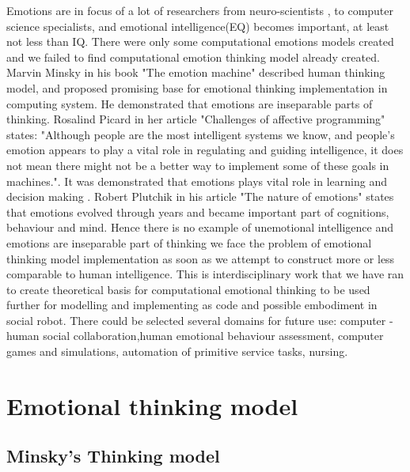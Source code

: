 Emotions are in focus of a lot of researchers from neuro-scientists \cite{emotionsbraintorobot, parsingreward, neuromodulatory, cubeofemotions}, to computer science specialists\cite{emotionandsociable, senticcomputing, hourglass, affectivemodelofinterplay, affectivecomputing}, and emotional intelligence(EQ) becomes important, at least not less than IQ.
There were only some computational emotions models created\cite{computationalmodelsemotion, computationalmodelsemotionscognition, evaluatingcomutationalmodel, threelevel} and we failed to find computational emotion thinking model already created. Marvin Minsky in his book "The emotion machine"\cite{emotionmachine} described human thinking model, and proposed promising base for emotional thinking implementation in computing system. He demonstrated that emotions are inseparable parts of thinking. Rosalind Picard in her article\cite{affectivecomputingchallanges} "Challenges of affective programming" states: "Although people are the most intelligent systems we know, and people’s emotion appears to play a vital role in regulating and guiding intelligence, it does not mean there might not be a better way to implement some of these goals in machines.". It was demonstrated that emotions plays vital role in learning and decision making \cite{roleofemotions}. Robert Plutchik in his article "The nature of emotions" \cite{natureofemotions} states that emotions evolved through years and became important part of cognitions, behaviour and mind. Hence there is no example of unemotional intelligence and emotions are inseparable part of thinking we face the problem of emotional thinking model implementation as soon as we attempt to construct more or less comparable to human intelligence. This is interdisciplinary work that we have ran to create theoretical basis for computational emotional thinking to be used further for modelling and implementing as code and possible embodiment in social robot. There could be selected several domains for future use: computer - human social collaboration,human emotional behaviour assessment, computer games and simulations, automation of primitive service tasks, nursing.

\section{Emotional thinking model}

\subsection{Minsky's Thinking model}

